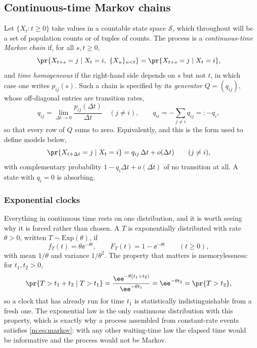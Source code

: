 \subsection{Continuous-time Markov chains}
\label{m:sec:ctmc}

Let $\{X_t : t\ge0\}$ take values in a countable state space $\mathcal S$, which
throughout will be a set of population counts or of tuples of counts. The process
is a \emph{continuous-time Markov chain} if, for all $s,t\ge0$,
\begin{equation}
\label{m:eq:markov}
\pr{X_{t+s}=j \mid X_t=i,\ \{X_u\}_{u<t}} = \pr{X_{t+s}=j\mid X_t=i},
\end{equation}
and \emph{time homogeneous} if the right-hand side depends on $s$ but not $t$, in
which case one writes $p_{ij}(s)$. Such a chain is specified by its
\emph{generator} $Q=(q_{ij})$, whose off-diagonal entries are transition rates,
\begin{equation}
\label{m:eq:generator}
q_{ij} = \lim_{\Delta t\to0}\frac{p_{ij}(\Delta t)}{\Delta t}\quad(j\neq i),
\qquad
q_{ii} = -\sum_{j\neq i}q_{ij} =: -q_i ,
\end{equation}
so that every row of $Q$ sums to zero. Equivalently, and this is the form used to
define models below,
\begin{equation}
\label{m:eq:infinitesimal}
\pr{X_{t+\Delta t}=j\mid X_t=i} = q_{ij}\,\Delta t + o(\Delta t)
\qquad(j\neq i),
\end{equation}
with complementary probability $1-q_i\Delta t+o(\Delta t)$ of no transition at all.
A state with $q_i=0$ is absorbing.

\subsubsection{Exponential clocks}
\label{m:sec:exp}

Everything in continuous time rests on one distribution, and it is worth seeing
why it is forced rather than chosen. A \rv{} $T$ is exponentially distributed with
rate $\theta>0$, written $T\sim\mathrm{Exp}(\theta)$, if
\begin{equation}
\label{m:eq:expdef}
f_T(t) = \theta\ee^{-\theta t},
\qquad
F_T(t) = 1-\ee^{-\theta t}
\qquad(t\ge0),
\end{equation}
with mean $1/\theta$ and variance $1/\theta^2$. The property that matters is
memorylessness: for $t_1,t_2>0$,
\begin{equation}
\label{m:eq:memoryless}
\pr{T>t_1+t_2\mid T>t_1}
= \frac{\ee^{-\theta(t_1+t_2)}}{\ee^{-\theta t_1}}
= \ee^{-\theta t_2}
= \pr{T>t_2},
\end{equation}
so a clock that has already run for time $t_1$ is statistically indistinguishable
from a fresh one. The exponential law is the only continuous distribution with this
property, which is exactly why a process assembled from constant-rate events
satisfies \cref{m:eq:markov}: with any other waiting-time law the elapsed time would
be informative and the process would not be Markov.

